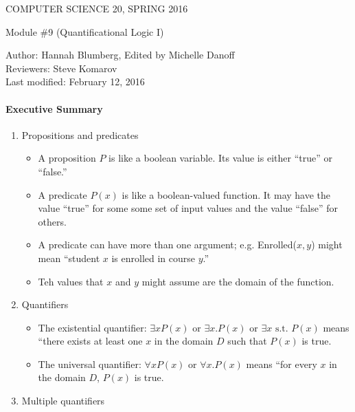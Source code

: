 \documentclass[12pt]{article}
\begin{document}
\begin{center}
COMPUTER SCIENCE 20, SPRING 2016 \\

\smallskip

Module \#9 (Quantificational Logic I)
\end{center}
Author: Hannah Blumberg, Edited by Michelle Danoff\\
Reviewers: Steve Komarov\\
Last modified: February 12, 2016

\medskip

\paragraph*{Executive Summary}
\begin{enumerate}

\item Propositions and predicates
\begin{itemize}

\item A proposition $P$ is like a boolean variable. Its value is either ``true'' or ``false.''
\item A predicate $P(x)$ is like a boolean-valued function. It may have the value ``true'' for some some set of input values and the value ``false'' for others.
\item A predicate can have more than one argument; e.g. Enrolled($x, y$) might mean ``student $x$ is enrolled in course $y$.'' 
\item Teh values that  $x$ and $y$ might assume are the domain of the function. 
\end{itemize}

\item Quantifiers
\begin{itemize}
\item The existential quantifier: $\exists x P(x)$ or $\exists x. P(x)$ or $\exists x \mbox{ s.t. }P(x)$ means ``there exists at least one $x$ in the domain $D$ such that $P(x)$ is true.

\item The universal quantifier: $\forall x P(x)$ or $\forall x. P(x)$  means ``for every $x$ in the domain $D$, $P(x)$ is true.

\end{itemize}

\item Multiple quantifiers
\begin{itemize}


\end{itemize}
\end{enumerate}
\end{document}
